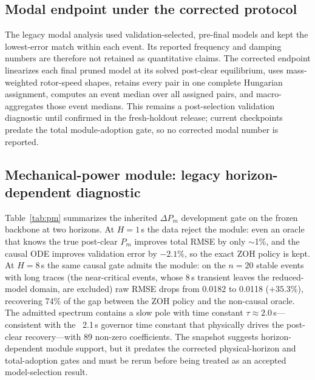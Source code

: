 \documentclass[journal]{IEEEtran}
\begin{document}
\subsection{Modal endpoint under the corrected protocol}
\label{sec:modal}
The legacy modal analysis used validation-selected, pre-final models and kept
the lowest-error match within each event. Its reported frequency and damping
numbers are therefore not retained as quantitative claims. The corrected
endpoint linearizes each final pruned model at its solved post-clear equilibrium,
uses mass-weighted rotor-speed shapes, retains every pair in one complete
Hungarian assignment, computes an event median over all assigned pairs, and
macro-aggregates those event medians. This remains a post-selection validation
diagnostic until confirmed in the fresh-holdout release; current checkpoints
predate the total module-adoption gate, so no corrected modal number is reported.

\subsection{Mechanical-power module: legacy horizon-dependent diagnostic}
\label{sec:pm}
Table~\ref{tab:pm} summarizes the inherited $\Delta P_m$ development gate on the frozen backbone
at two horizons. At $H{=}1$\,s the data reject the module: even an oracle that
knows the true post-clear $P_m$ improves total RMSE by only $\sim$1\%, and the
causal ODE improves validation error by $-2.1\%$, so the exact ZOH policy is
kept. At $H{=}8$\,s the same causal gate admits the module: on the $n{=}20$ stable
events with long traces (the near-critical events, whose 8\,s transient leaves
the reduced-model domain, are excluded) raw RMSE drops from 0.0182 to 0.0118
($+35.3\%$), recovering 74\% of the gap between the ZOH policy and the
non-causal oracle. The admitted spectrum contains a slow pole with time
constant $\tau\approx2.0$\,s---consistent with the ~2.1\,s governor time
constant that physically drives the post-clear recovery---with 89 non-zero
coefficients. The snapshot suggests horizon-dependent module support, but it
predates the corrected physical-horizon and total-adoption gates and must be
rerun before being treated as an accepted model-selection result.
\end{document}
